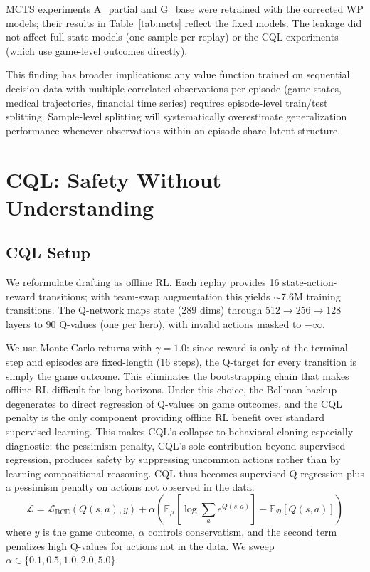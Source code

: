 \documentclass[journal]{IEEEtran}
\begin{document}
MCTS experiments A\_partial and G\_base were retrained with the corrected WP models; their results in Table~\ref{tab:mcts} reflect the fixed models. The leakage did not affect full-state models (one sample per replay) or the CQL experiments (which use game-level outcomes directly).

This finding has broader implications: any value function trained on sequential decision data with multiple correlated observations per episode (game states, medical trajectories, financial time series) requires episode-level train/test splitting. Sample-level splitting will systematically overestimate generalization performance whenever observations within an episode share latent structure.

\section{CQL: Safety Without Understanding}
\label{sec:cql}

\subsection{CQL Setup}

We reformulate drafting as offline RL. Each replay provides 16 state-action-reward transitions; with team-swap augmentation this yields $\sim$7.6M training transitions. The Q-network maps state (289 dims) through 512$\to$256$\to$128 layers to 90 Q-values (one per hero), with invalid actions masked to $-\infty$.

We use Monte Carlo returns with $\gamma = 1.0$: since reward is only at the terminal step and episodes are fixed-length (16 steps), the Q-target for every transition is simply the game outcome. This eliminates the bootstrapping chain that makes offline RL difficult for long horizons. Under this choice, the Bellman backup degenerates to direct regression of Q-values on game outcomes, and the CQL penalty is the only component providing offline RL benefit over standard supervised learning. This makes CQL's collapse to behavioral cloning especially diagnostic: the pessimism penalty, CQL's sole contribution beyond supervised regression, produces safety by suppressing uncommon actions rather than by learning compositional reasoning. CQL thus becomes supervised Q-regression plus a pessimism penalty on actions not observed in the data:
\begin{equation}
\mathcal{L} = \mathcal{L}_\text{BCE}(Q(s,a), y) + \alpha \left( \mathbb{E}_\mu[\log \sum_a e^{Q(s,a)}] - \mathbb{E}_\mathcal{D}[Q(s,a)] \right)
\end{equation}
where $y$ is the game outcome, $\alpha$ controls conservatism, and the second term penalizes high Q-values for actions not in the data. We sweep $\alpha \in \{0.1, 0.5, 1.0, 2.0, 5.0\}$.
\end{document}
